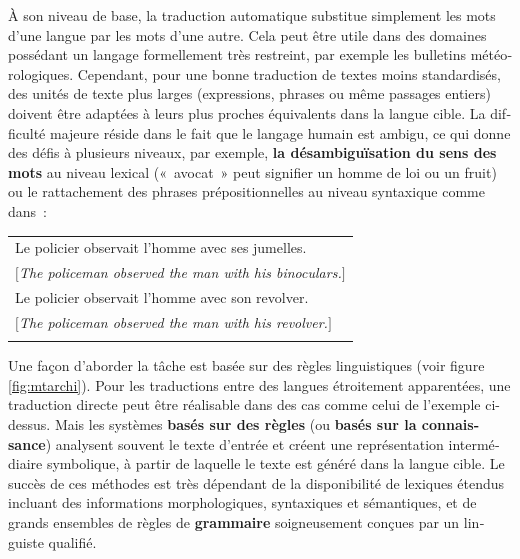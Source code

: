 \begin{french}
\begin{multicols}{2}
À son niveau de base, la traduction automatique substitue simplement les mots d'une langue
par les mots d'une autre. Cela peut être utile dans des domaines
possédant un langage formellement très restreint, par exemple les
bulletins météorologiques. Cependant, pour une bonne traduction de
textes moins standardisés, des unités de texte plus larges
(expressions, phrases ou même passages entiers) doivent être adaptées à
leurs plus proches équivalents dans la langue cible. La difficulté
majeure réside dans le fait que le langage humain est ambigu, ce qui
donne des défis à plusieurs niveaux, par exemple, {\bf la
  désambiguïsation du sens des mots} au niveau lexical («~avocat~»
peut signifier un homme de loi ou un fruit) ou le rattachement des phrases prépositionnelles au niveau syntaxique comme dans~:

\begin{tabular}{l}
\\
Le policier observait l'homme avec ses jumelles.\\
$[${\em The policeman observed the man with his binoculars.}$]$\\
Le policier observait l'homme avec son revolver.\\
$[${\em The policeman observed the man with his revolver.}$]$\\
\\
\end{tabular}

Une façon d'aborder la tâche est basée sur des règles
linguistiques (voir figure \ref{fig:mtarchi}). Pour les traductions entre des langues étroitement
apparentées, une traduction directe peut être réalisable dans des cas
comme celui de l'exemple ci-dessus. Mais les systèmes {\bf basés sur  des
règles} (ou {\bf basés sur la connaissance}) analysent souvent le texte
d'entrée et créent une représentation intermédiaire symbolique, à
partir de laquelle le texte est généré dans la langue cible.  Le
succès de ces méthodes est très dépendant de la disponibilité de
lexiques étendus incluant des informations morphologiques, syntaxiques
et sémantiques, et de grands ensembles de règles de {\bf grammaire}
soigneusement conçues par un linguiste qualifié.


\end{multicols}
\end{french}
